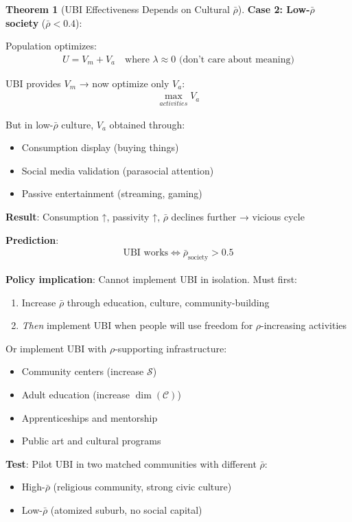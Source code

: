\documentclass[11pt,a4paper]{article}
\theoremstyle{definition}
\newtheorem{theorem}{Theorem}[section]
\theoremstyle{remark}
\newcommand{\CC}{\mathcal{C}}
\begin{document}
\begin{enumerate}
\begin{theorem}[UBI Effectiveness Depends on Cultural \(\bar{\rho}\)]
\textbf{Case 2: Low-\(\bar{\rho}\) society} (\(\bar{\rho} < 0.4\)):

Population optimizes:
\begin{align}
U = V_m + V_a \quad \text{where } \lambda \approx 0 \text{ (don't care about meaning)}
\end{align}

UBI provides \(V_m\) → now optimize only \(V_a\):
\begin{align}
\max_{activities} V_a
\end{align}

But in low-\(\bar{\rho}\) culture, \(V_a\) obtained through:
\begin{itemize}
    \item Consumption display (buying things)
    \item Social media validation (parasocial attention)
    \item Passive entertainment (streaming, gaming)
\end{itemize}

\textbf{Result}: Consumption ↑, passivity ↑, \(\bar{\rho}\) declines further → vicious cycle

\textbf{Prediction}:
\begin{align}
\text{UBI works} \iff \bar{\rho}_{\text{society}} > 0.5
\end{align}

\textbf{Policy implication}: Cannot implement UBI in isolation. Must first:
\begin{enumerate}
    \item Increase \(\bar{\rho}\) through education, culture, community-building
    \item \textit{Then} implement UBI when people will use freedom for \(\rho\)-increasing activities
\end{enumerate}

Or implement UBI with \(\rho\)-supporting infrastructure:
\begin{itemize}
    \item Community centers (increase \(\mathcal{S}\))
    \item Adult education (increase \(\dim(\CC)\))
    \item Apprenticeships and mentorship
    \item Public art and cultural programs
\end{itemize}

\textbf{Test}: Pilot UBI in two matched communities with different \(\bar{\rho}\):
\begin{itemize}
    \item High-\(\bar{\rho}\) (religious community, strong civic culture)
    \item Low-\(\bar{\rho}\) (atomized suburb, no social capital)
\end{itemize}


\end{theorem}
\end{enumerate}
\end{document}
